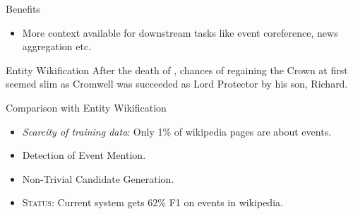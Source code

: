 \begin{frame}{Benefits}
  \begin{itemize}
  \item More context available for downstream tasks like event coreference, news aggregation etc.
  \end{itemize}
  \begin{block}{Entity Wikification}
    After the { death of },  chances of regaining the Crown at first seemed slim as Cromwell was succeeded as Lord Protector by his son, Richard.
  \end{block}
\end{frame}

\begin{frame}{Comparison with Entity Wikification}
  \begin{itemize}[<+->]
  \item \emph{Scarcity of training data}: Only 1\% of wikipedia pages are about events.
  \item Detection of Event Mention.
  \item Non-Trivial Candidate Generation.
  \item \textsc{Status:} Current system gets 62\% F1 on events in wikipedia.
  \end{itemize}
\end{frame}






